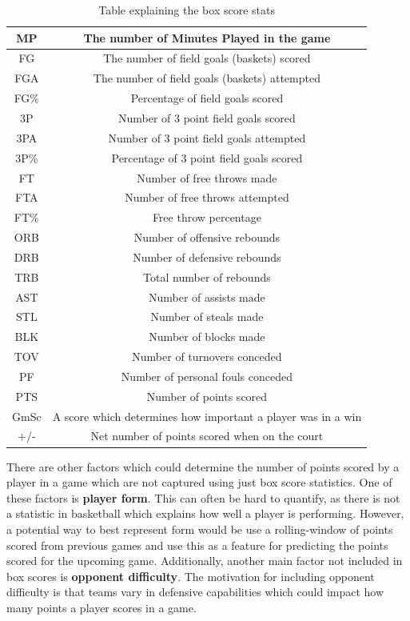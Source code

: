 \documentclass[a4paper,11pt,twoside]{article}
\begin{document}
\begin{table} [h!]
\begin{center}
\begin{tabular}{ |c|c| } 
 \hline
MP & The number of Minutes Played in the game\\ 
 \hline
FG & The number of field goals (baskets) scored \\ 
 \hline
 FGA & The number of field goals (baskets) attempted \\ 
 \hline
FG\% & Percentage of field goals scored\\ 
 \hline
3P & Number of 3 point field goals scored \\
 \hline
 3PA & Number of 3 point field goals attempted \\ 
 \hline
 3P\% & Percentage of 3 point field goals scored\\
\hline
FT & Number of free throws made\\
\hline
FTA & Number of free throws attempted\\
\hline
FT\% & Free throw percentage\\
\hline
ORB & Number of offensive rebounds\\
\hline
DRB & Number of defensive rebounds\\
\hline
TRB & Total number of rebounds\\
\hline
AST & Number of assists made\\
\hline
STL & Number of steals made\\
\hline
BLK & Number of blocks made\\
\hline
TOV & Number of turnovers conceded\\
\hline
PF & Number of personal fouls conceded\\
\hline
PTS & Number of points scored\\
\hline
GmSc & A score which determines how important a player was in a win\\
\hline
+/- & Net number of points scored when on the court\\
\hline
\end{tabular}
\end{center}
\caption{Table explaining the box score stats}
\end{table}
\vspace{5mm}


There are other factors which could determine the number of points scored by a player in a game which are not captured using just box score statistics. One of these factors is \textbf{player form}. This can often be hard to quantify, as there is not a statistic in basketball which explains how well a player is performing.  However, a potential way to best represent form would be use a rolling-window of points scored from previous games and use this as a feature for predicting the points scored for the upcoming game.  Additionally, another main factor not included in box scores is \textbf{opponent difficulty}. The motivation for including opponent difficulty is that teams vary in defensive capabilities which could impact how many points a player scores in a game.
\vspace{5mm}
\end{document}
